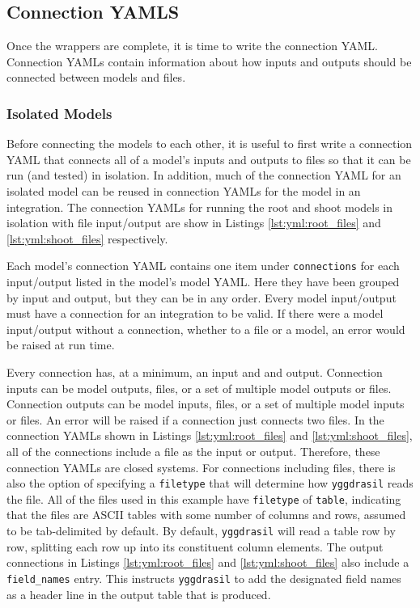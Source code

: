 \documentclass[journal]{IEEEtran}
\newcommand{\pkg}{{\tt yggdrasil}{}}
\newcommand{\rootymlfiles}{}
\newcommand{\shootymlfiles}{}
\begin{document}
\subsection{Connection YAMLS}
%
Once the wrappers are complete, it is time to write the connection YAML. Connection YAMLs contain information about how inputs and outputs should be connected between models and files. 

\subsubsection{Isolated Models}
%
Before connecting the models to each other, it is useful to first write a connection YAML that connects all of a model's inputs and outputs to files so that it can be run (and tested) in isolation. In addition, much of the connection YAML for an isolated model can be reused in connection YAMLs for the model in an integration. The connection YAMLs for running the root and shoot models in isolation with file input/output are show in Listings \ref{lst:yml:root_files} and \ref{lst:yml:shoot_files} respectively.
%
\rootymlfiles
%
\shootymlfiles
%
Each model's connection YAML contains one item under {\tt connections} for each input/output listed in the model's model YAML. Here they have been grouped by input and output, but they can be in any order. Every model input/output must have a connection for an integration to be valid. If there were a model input/output without a connection, whether to a file or a model, an error would be raised at run time. 

Every connection has, at a minimum, an input and and output. Connection inputs can be model outputs, files, or a set of multiple model outputs or files. Connection outputs can be model inputs, files, or a set of multiple model inputs or files. An error will be raised if a connection just connects two files. In the connection YAMLs shown in Listings \ref{lst:yml:root_files} and \ref{lst:yml:shoot_files}, all of the connections include a file as the input or output. Therefore, these connection YAMLs are closed systems. For connections including files, there is also the option of specifying a {\tt filetype} that will determine how {\pkg} reads the file. All of the files used in this example have {\tt filetype} of {\tt table}, indicating that the files are ASCII tables with some number of columns and rows, assumed to be tab-delimited by default. By default, {\pkg} will read a table row by row, splitting each row up into its constituent column elements. The output connections in Listings \ref{lst:yml:root_files} and \ref{lst:yml:shoot_files} also include a {\tt field\_names} entry. This instructs {\pkg} to add the designated field names as a header line in the output table that is produced.
\end{document}
